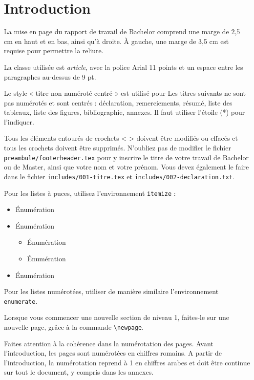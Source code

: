 \section*{Introduction}

La mise en page du rapport de travail de Bachelor comprend une marge de 2,5 cm en haut et en bas, ainsi qu’à droite. À gauche, une marge de 3,5 cm est requise pour permettre la reliure.

La classe utilisée est \emph{article}, avec la police Arial 11 points et un espace entre les paragraphes au-dessus de 9 pt.

Le style « titre non numéroté centré » est utilisé pour Les titres suivants ne sont pas numérotés et sont centrés : déclaration, remerciements, résumé, liste des tableaux, liste des figures, bibliographie, annexes. Il faut utiliser l'étoile (*) pour l'indiquer.

Tous les éléments entourés de crochets < > doivent être modifiés ou effacés et tous les crochets doivent être supprimés.
N’oubliez pas de modifier le fichier \texttt{preambule/footerheader.tex} pour y inscrire le titre de votre travail de Bachelor ou de Master, ainsi que votre nom et votre prénom. Vous devez également le faire dans le fichier \texttt{includes/001-titre.tex} et \texttt{includes/002-declaration.txt}.

Pour les listes à puces, utilisez l'environnement \texttt{itemize} :

\begin{itemize}[itemsep=0pt]
	\item Énumération
	\item Énumération
	\begin{itemize}[itemsep=0pt]
		\item Énumération
		\item Énumération
	\end{itemize}
	\item Énumération
\end{itemize}

Pour les listes numérotées, utiliser de manière similaire l'environnement \texttt{enumerate}.

Lorsque vous commencer une nouvelle section de niveau 1, faites-le sur une nouvelle page, grâce à la commande \verb?\newpage?.

Faites attention à la cohérence dans la numérotation des pages. Avant l'introduction, les pages sont numérotées en chiffres romains. A partir de l'introduction, la numérotation reprend à 1 en chiffres arabes et doit être continue sur tout le document, y compris dans les annexes.

